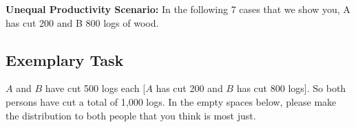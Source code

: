 \documentclass[egregdoesnotlikesansseriftitles]{scrartcl}
\begin{document}
\noindent\textbf{Unequal Productivity Scenario:} In the following 7 cases that we show you, A has cut 200 and B 800 logs of wood. %


\clearpage
\subsection*{Exemplary Task}
$A$ and $B$ have cut 500 logs each $[A$ has cut 200 and $B$ has cut 800 logs$]$. %
So both persons have cut a total of 1,000 logs. %
In the empty spaces below, please make the distribution to both people that you think is most just.\vspace{4ex} %
\end{document}
